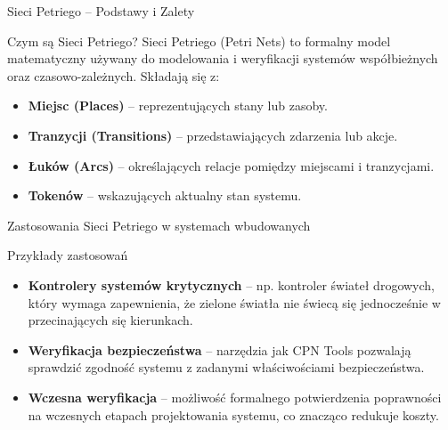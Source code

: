 \documentclass{beamer}
\begin{document}
\begin{frame}{Sieci Petriego – Podstawy i Zalety}
  \begin{block}{Czym są Sieci Petriego?}
    Sieci Petriego (Petri Nets) to formalny model matematyczny używany do modelowania i weryfikacji systemów współbieżnych oraz czasowo-zależnych. Składają się z:
  \begin{itemize}
    \item \textbf{Miejsc (Places)} – reprezentujących stany lub zasoby.
    \item \textbf{Tranzycji (Transitions)} – przedstawiających zdarzenia lub akcje.
    \item \textbf{Łuków (Arcs)} – określających relacje pomiędzy miejscami i tranzycjami.
    \item \textbf{Tokenów} – wskazujących aktualny stan systemu.
  \end{itemize}
  \end{block}
\end{frame}

\begin{frame}{Zastosowania Sieci Petriego w systemach wbudowanych}
  \begin{block}{Przykłady zastosowań}
    \begin{itemize}
      \item \textbf{Kontrolery systemów krytycznych} – np. kontroler świateł drogowych, który wymaga zapewnienia, że zielone światła nie świecą się jednocześnie w przecinających się kierunkach.
      \item \textbf{Weryfikacja bezpieczeństwa} – narzędzia jak CPN Tools pozwalają sprawdzić zgodność systemu z zadanymi właściwościami bezpieczeństwa.
      \item \textbf{Wczesna weryfikacja} – możliwość formalnego potwierdzenia poprawności na wczesnych etapach projektowania systemu, co znacząco redukuje koszty.
    \end{itemize}
  \end{block}
\end{frame}
\end{document}
